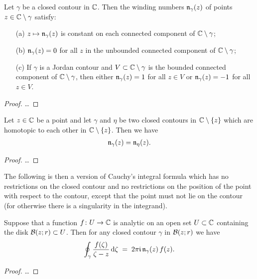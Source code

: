 \begin{lemma}
  \label{lem:winding_number_properties}
  Let $\gamma$ be a closed contour in $\bC$. Then the winding
  numbers $\windN{\gamma}{z}$ of points $z \in \bC \setminus \gamma$
  satisfy:
  \begin{itemize}
    \item[(a)] $z \mapsto \windN{\gamma}{z}$ is constant on
      each connected component of $\bC \setminus \gamma$;
    \item[(b)] $\windN{\gamma}{z} = 0$ for all $z$ in the
      unbounded connected component of $\bC \setminus \gamma$;
    \item[(c)] If $\gamma$ is a Jordan contour and
      $V \subset \bC \setminus \gamma$ is the bounded connected
      component of $\bC \setminus \gamma$, then
      either $\windN{\gamma}{z} = 1$ for all $z \in V$
      or $\windN{\gamma}{z} = -1$ for all $z \in V$.
  \end{itemize}
\end{lemma}
\begin{proof}
  \ldots
\end{proof}

\begin{lemma}
  \label{lem:winding_homotopy_invariance}
  Let $z \in \bC$ be a point and let $\gamma$ and $\eta$ be two
  closed contours in $\bC \setminus \set{z}$ which are homotopic
  to each other in $\bC \setminus \set{z}$. Then we have
  \begin{align*}
    \windN{\gamma}{z} = \windN{\eta}{z} .
  \end{align*}
\end{lemma}
\begin{proof}
  \ldots
\end{proof}

The following is then a version of Cauchy's integral formula
which has no restrictions on the closed contour and
no restrictions on the position of the point with respect to
the contour, except that the point must not lie on the contour
(for otherwise there is a singularity in the integrand).

\begin{theorem}
  \label{thm:CAUCHY_FORMULA}
  Suppose that a function $f \colon U \to \bC$ is analytic on an open
  set $U \subset \bC$ containing the disk $\DiskRC{r}{z} \subset U$.
  Then for any closed contour $\gamma$ in $\DiskRC{r}{z}$ we have
  \begin{align*}
    \oint_\gamma \frac{f(\zeta)}{\zeta - z} \, \ud \zeta
    \; = \; 2\pi \ii \, \windN{\gamma}{z} \, f(z) .
  \end{align*}
\end{theorem}
\begin{proof}
  \ldots
\end{proof}
